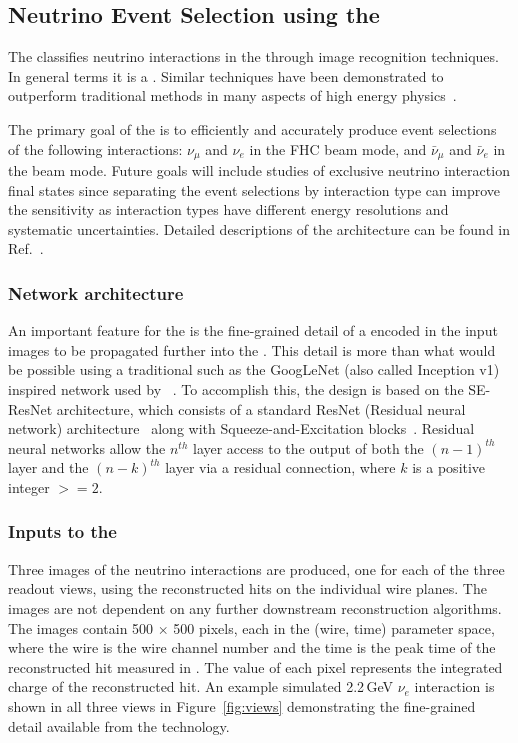 
\subsection{Neutrino Event Selection using the }
The   classifies neutrino interactions in the   through image recognition techniques. In general terms it is a . Similar techniques have been demonstrated to outperform traditional methods in many aspects of high energy physics~\cite{radovicNature}.

The primary goal of the  is to efficiently and accurately produce event selections of the following interactions: $\nu_\mu$ and $\nu_e$ in the FHC beam mode, and $\bar{\nu}_\mu$ and $\bar{\nu}_e$ in the  beam mode. Future goals will include studies of exclusive neutrino interaction final states since separating the event selections by interaction type can improve the sensitivity as interaction types have different energy resolutions and systematic uncertainties. Detailed descriptions of the  architecture can be found in Ref.~\cite{cvnPaper}.

\subsubsection{Network architecture}
An important feature for the   is the fine-grained detail of a  encoded in the input images to be propagated further into the . This detail is more than what would be possible using a traditional  such as the GoogLeNet (also called Inception v1)~\cite{GoogLeNet} inspired network used by ~\cite{novacvn}. To accomplish this, the  design is based on the SE-ResNet architecture, which consists of a standard ResNet (Residual neural network) architecture~\cite{He-et-al-2015-deep} along with Squeeze-and-Excitation blocks~\cite{Hu-et-al-2017-squeeze}. Residual neural networks allow the $n^{th}$ layer access to the output of both the $(n-1)^{th}$ layer and the $(n-k)^{th}$ layer via a residual connection, where $k$ is a positive integer $>=2$.

\subsubsection{Inputs to the }
\label{sec:inputs}
Three images of the neutrino interactions are produced, one for each of the three readout views, using the reconstructed hits on the individual wire planes. The images are not dependent on any further downstream reconstruction algorithms. The images contain 500 $\times$ 500 pixels, each in the (wire, time) parameter space, where the wire is the wire channel number and the time is the peak time of the reconstructed hit measured in . The value of each pixel represents the integrated charge of the reconstructed hit. An example simulated 2.2\,GeV $\nu_e$ interaction is shown in all three views in Figure~\ref{fig:views} demonstrating the fine-grained detail available from the  technology.

